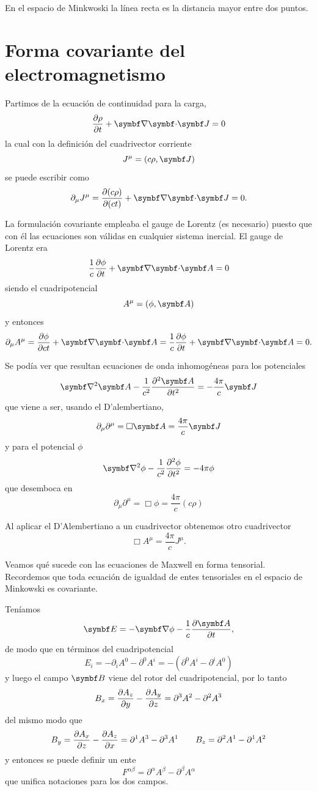 \documentclass[10pt,oneside]{CBFT_book}
\begin{document}
En el espacio de Minkwoski la línea recta es la distancia mayor entre dos puntos.


\section{Forma covariante del electromagnetismo}

Partimos de la ecuación de continuidad para la carga,
\[
	\dpar{\rho}{t} + \divem{J} = 0
\]
la cual con la definición del cuadrivector corriente
\[
	J^\mu = ( c\rho , \vb{J} )
\]
se puede escribir como 
\[
	\partial_\mu J^\mu = \dpar{ (c\rho)}{(ct)} + \divem{J} = 0 .
\]

La formulación covariante empleaba el gauge de Lorentz (es necesario) puesto que con él las 
ecuaciones son válidas en cualquier sistema inercial. El gauge de Lorentz era
\[
	\frac{1}{c} \dpar{\phi}{t} + \divem{A} = 0
\]
siendo el cuadripotencial
\[
	A^\mu = ( \phi , \vb{A} ) 
\]
y entonces 
\[
	\partial_\mu A^\mu = \dpar{\phi}{ct} + \divem{A} = \frac{1}{c} \dpar{\phi}{t} + \divem{A} = 0 .
\]

Se podía ver que resultan ecuaciones de onda inhomogéneas para los potenciales
\[
	\Nabla^2 \vb{A} - \frac{1}{c^2} \dpar[2]{\vb{A}}{t} = -\frac{4\pi}{c} \vb{J}
\]
que viene a ser, usando el D'alembertiano, 
\[
	\partial_\mu\partial^\mu = \Box \vb{A} = \frac{4\pi}{c} \vb{J}
\]
y para el potencial $\phi$
\[
	\Nabla^2 \phi - \frac{1}{c^2} \dpar[2]{\phi}{t} = - 4\pi \phi
\]
que desemboca en 
\[
	\partial_\mu\partial^\mu = \Box \phi = \frac{4\pi}{c} ( c\rho )
\]

Al aplicar el D'Alembertiano a un cuadrivector obtenemos otro cuadrivector 
\[
	\Box A^\mu = \frac{4\pi}{c} J^\mu.
\]


Veamos qué sucede con las ecuaciones de Maxwell en forma tensorial.
Recordemos que toda ecuación de igualdad de entes tensoriales en el espacio
de Minkowski es covariante.

Teníamos
\[
	\vb{E} = -\Nabla \phi - \frac{1}{c}\dpar{\vb{A}}{t}, 
\]
de modo que en términos del cuadripotencial
\[
	E_i = - \partial_i A^0 -\partial^0 A^i = -( \partial^0 A^i - \partial^i A^0)
\]
y luego el campo $\vb{B}$ viene del rotor del cuadripotencial, por lo tanto
\[
	B_x = \frac{\partial^{\hspace{-0.05em}} {A_z}}{\partial {y}^{\hspace{-0.05em}}} - \frac{\partial^{\hspace{-0.05em}} {A_y}}{\partial {z}^{\hspace{-0.05em}}} = \partial^3A^2 - \partial^2A^3
\]
del mismo modo que
\[
	B_y = \frac{\partial^{\hspace{-0.05em}} {A_x}}{\partial {z}^{\hspace{-0.05em}}} - \frac{\partial^{\hspace{-0.05em}} {A_z}}{\partial {x}^{\hspace{-0.05em}}} = \partial^1A^3 - \partial^3A^1 \qquad 
	B_z = \partial^2A^1 - \partial^1A^2
\]
y entonces se puede definir un ente
\[
	F^{\alpha\beta} = \partial^\alpha A^\beta - \partial^\beta A^\alpha
\]
que unifica notaciones para los dos campos.
\end{document}

